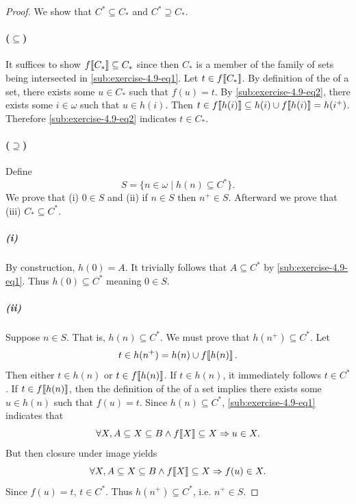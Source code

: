 \documentclass{report}
\begin{document}
  \begin{proof}

    We show that $C^* \subseteq C_*$ and $C^* \supseteq C_*$.

    \paragraph{($\subseteq$)}%

      It suffices to show $f\!\left\llbracket C_*\right\rrbracket \subseteq C_*$ since then $C_*$ is a
        member of the family of sets being intersected in
        \eqref{sub:exercise-4.9-eq1}.
      Let $t \in f\!\left\llbracket C_*\right\rrbracket$.
      By definition of the  of a set, there exists some
        $u \in C_*$ such that $f(u) = t$.
      By \eqref{sub:exercise-4.9-eq2}, there exists some $i \in \omega$ such
        that $u \in h(i)$.
      Then $t \in f\!\left\llbracket h(i)\right\rrbracket \subseteq h(i) \cup f\!\left\llbracket h(i)\right\rrbracket = h(i^+)$.
      Therefore \eqref{sub:exercise-4.9-eq2} indicates $t \in C_*$.

    \paragraph{($\supseteq$)}%

      Define $$S = \{n \in \omega \mid h(n) \subseteq C^*\}.$$
      We prove that (i) $0 \in S$ and (ii) if $n \in S$ then $n^+ \in S$.
      Afterward we prove that (iii) $C_* \subseteq C^*$.

      \subparagraph{(i)}%
      \label{spar:exercise-4.9-i}

        By construction, $h(0) = A$.
        It trivially follows that $A \subseteq C^*$ by
          \eqref{sub:exercise-4.9-eq1}.
        Thus $h(0) \subseteq C^*$ meaning $0 \in S$.

      \subparagraph{(ii)}%
      \label{spar:exercise-4.9-ii}

        Suppose $n \in S$.
        That is, $h(n) \subseteq C^*$.
        We must prove that $h(n^+) \subseteq C^*$.
        Let $$t \in h(n^+) = h(n) \cup f\!\left\llbracket h(n)\right\rrbracket.$$
        Then either $t \in h(n)$ or $t \in f\!\left\llbracket h(n)\right\rrbracket$.
        If $t \in h(n)$, it immediately follows $t \in C^*$.
        If $t \in f\!\left\llbracket h(n)\right\rrbracket$, then the definition of the 
          of a set implies there exists some $u \in h(n)$ such that $f(u) = t$.
        Since $h(n) \subseteq C^*$, \eqref{sub:exercise-4.9-eq1} indicates that
          $$\forall X, A \subseteq X \subseteq B \land
            f\!\left\llbracket X\right\rrbracket \subseteq X \Rightarrow u \in X.$$
        But then closure under image yields
          $$\forall X, A \subseteq X \subseteq B \land
            f\!\left\llbracket X\right\rrbracket \subseteq X \Rightarrow f(u) \in X.$$
        Since $f(u) = t$, $t \in C^*$.
        Thus $h(n^+) \subseteq C^*$, i.e. $n^+ \in S$.


\end{proof}
\end{document}
